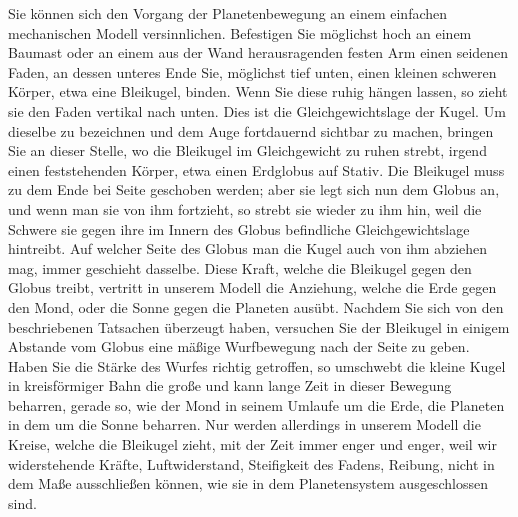 \documentclass[a4paper, 11pt, oneside, german]{article}
\begin{document}
Sie können sich den Vorgang der Planetenbewegung an einem einfachen mechanischen Modell versinnlichen. Befestigen Sie möglichst hoch an einem Baumast oder an einem aus der Wand herausragenden festen Arm einen seidenen Faden, an dessen unteres Ende Sie, möglichst tief unten, einen kleinen schweren Körper, etwa eine Bleikugel, binden. Wenn Sie diese ruhig hängen lassen, so zieht sie den Faden vertikal nach unten. Dies ist die Gleichgewichtslage der Kugel. Um dieselbe zu bezeichnen und dem Auge fortdauernd sichtbar zu machen, bringen Sie an dieser Stelle, wo die Bleikugel im Gleichgewicht zu ruhen strebt, irgend einen feststehenden Körper, etwa einen Erdglobus auf Stativ. Die Bleikugel muss zu dem Ende bei Seite geschoben werden; aber sie legt sich nun dem Globus an, und wenn man sie von ihm fortzieht, so strebt sie wieder zu ihm hin, weil die Schwere sie gegen ihre im Innern des Globus befindliche Gleichgewichtslage hintreibt. Auf welcher Seite des Globus man die Kugel auch von ihm abziehen mag, immer geschieht dasselbe. Diese Kraft, welche die Bleikugel gegen den Globus treibt, vertritt in unserem Modell die Anziehung, welche die Erde gegen den Mond, oder die Sonne gegen die Planeten ausübt. Nachdem Sie sich von den beschriebenen Tatsachen überzeugt haben, versuchen Sie der Bleikugel in einigem Abstande vom Globus eine mäßige Wurfbewegung nach der Seite zu geben. Haben Sie die Stärke des Wurfes richtig getroffen, so umschwebt die kleine Kugel in kreisförmiger Bahn die große und kann lange Zeit in dieser Bewegung beharren, gerade so, wie der Mond in seinem Umlaufe um die Erde, die Planeten in dem um die Sonne beharren. Nur werden allerdings in unserem Modell die Kreise, welche die Bleikugel zieht, mit der Zeit immer enger und enger, weil wir widerstehende Kräfte, Luftwiderstand, Steifigkeit des Fadens, Reibung, nicht in dem Maße ausschließen können, wie sie in dem Planetensystem ausgeschlossen sind.
\end{document}
